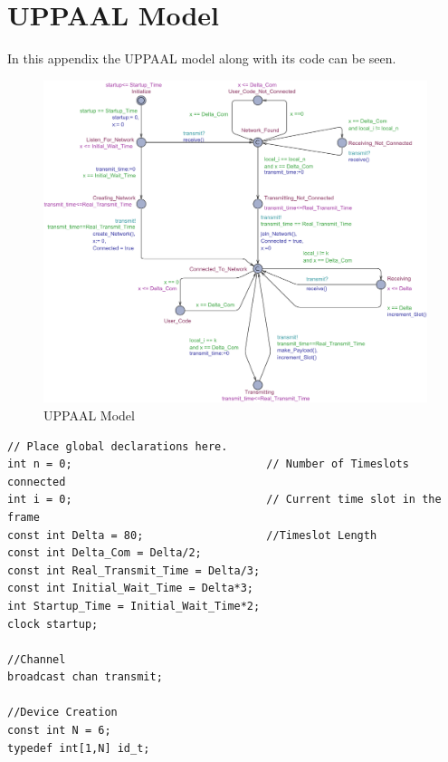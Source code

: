 \chapter{UPPAAL Model}\label{app:UPPAAL}
In this appendix the UPPAAL model along with its code can be seen.

\begin{figure}
	\hspace{-100pt}
  \includegraphics[width=1.40\textwidth]{Figures/Model/Device.pdf} 
\caption{UPPAAL Model}
\end{figure}

\begin{lstlisting}[language={[GUI]Uppaal}, % use GUI flavor
columns={[l]flexible},
frameround=fftt, frame=shadowbox, rulesepcolor=\color{gray},
caption={Code for the global declarations.}]
// Place global declarations here.
int n = 0;                    			// Number of Timeslots connected
int i = 0;                   			// Current time slot in the frame
const int Delta = 80;                   //Timeslot Length
const int Delta_Com = Delta/2;
const int Real_Transmit_Time = Delta/3;
const int Initial_Wait_Time = Delta*3;
int Startup_Time = Initial_Wait_Time*2;
clock startup;

//Channel
broadcast chan transmit;

//Device Creation
const int N = 6;
typedef int[1,N] id_t;
\end{lstlisting}


